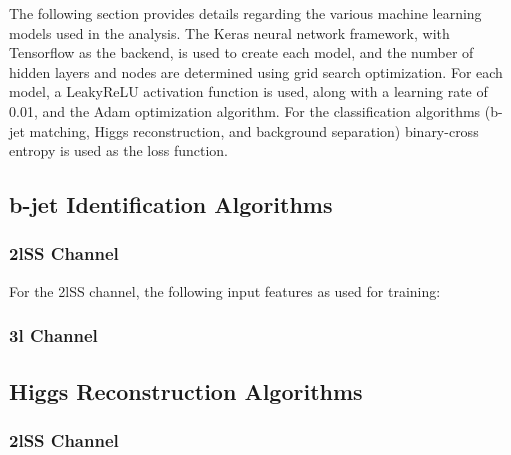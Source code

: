
The following section provides details regarding the various machine learning models used in the analysis. The Keras neural network framework, with Tensorflow as the backend, is used to create each model, and the number of hidden layers and nodes are determined using grid search optimization. For each model, a LeakyReLU activation function is used, along with a learning rate of 0.01, and the Adam optimization algorithm. For the classification algorithms (b-jet matching, Higgs reconstruction, and background separation) binary-cross entropy is used as the loss function. 

\subsection{b-jet Identification Algorithms}
\label{subsec:higgsRecoMVA}

\subsubsection{2lSS Channel}
\label{subsec:Apptop2lSS}
                                                                                                                     
For the 2lSS channel, the following input features as used for training:

\subsubsection{3l Channel}
\label{subsec:top3l}



\subsection{Higgs Reconstruction Algorithms}
\label{subsec:higgsRecoMVA}

\subsubsection{2lSS Channel}
\label{subsec:higgs2lSS}



